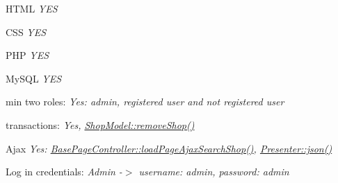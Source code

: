 \begin{DoxyItemize}
\item H\+T\+M\+L {\itshape Y\+E\+S}
\item C\+S\+S {\itshape Y\+E\+S}
\item P\+H\+P {\itshape Y\+E\+S}
\item My\+S\+Q\+L {\itshape Y\+E\+S}
\item min two roles\+: {\itshape Yes\+: admin, registered user and not registered user}
\item transactions\+: {\itshape Yes, \hyperlink{classShopModel_ae035aa872e97c08247d203f90e228fe2}{Shop\+Model\+::remove\+Shop()}}
\item Ajax {\itshape Yes\+: \hyperlink{classBasePageController_a96ace79928e80d29e6560b1fb965e859}{Base\+Page\+Controller\+::load\+Page\+Ajax\+Search\+Shop()}, \hyperlink{classPresenter_a02088a50a3134097a1b785b0315937b6}{Presenter\+::json()}}
\item Log in credentials\+: {\itshape Admin -\/$>$ username\+: admin, password\+: admin} 
\end{DoxyItemize}